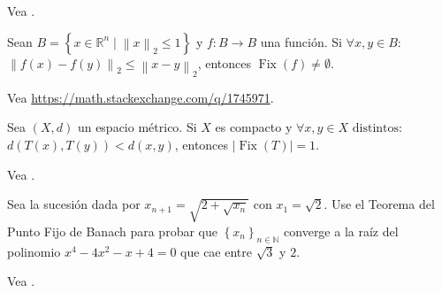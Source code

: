 \begin{solutionordottedlines}
	Vea \url{}.
\end{solutionordottedlines}

\question

Sean
\begin{math}
	B=
	\left\{x\in\mathbb{R}^{n}\mid{\left\|x\right\|}_{2}\leq 1\right\}
\end{math}
y $f\colon B\to B$ una función.
Si $\forall x,y\in B$: ${\left\|f\left(x\right)-f\left(y\right)\right\|}_{2}\leq{\left\|x-y\right\|}_{2}$, entonces
$\operatorname{Fix}\left(f\right)\neq\emptyset$.

\begin{solutionordottedlines}
	Vea \url{https://math.stackexchange.com/q/1745971}.
\end{solutionordottedlines}

\question

Sea $\left(X,d\right)$ un espacio métrico.
Si $X$ es compacto y $\forall x,y\in X\text{ distintos}$:
$d\left(T\left(x\right),T\left(y\right)\right)<d\left(x,y\right)$,
entonces $\left|\operatorname{Fix}\left(T\right)\right|=1$.

\begin{solutionordottedlines}
	Vea \url{}.
\end{solutionordottedlines}







\question

Sea la sucesión dada por $x_{n+1}=\sqrt{2+\sqrt{x_{n}}}$ con
$x_{1}=\sqrt{2}$.
Use el Teorema del Punto Fijo de Banach para probar que
$\left\{x_{n}\right\}_{n\in\mathbb{N}}$ converge a la raíz del
polinomio $x^{4}-4x^{2}-x+4=0$ que cae entre $\sqrt{3}$ y $2$.

\begin{solutionordottedlines}
	Vea \url{}.
\end{solutionordottedlines}

